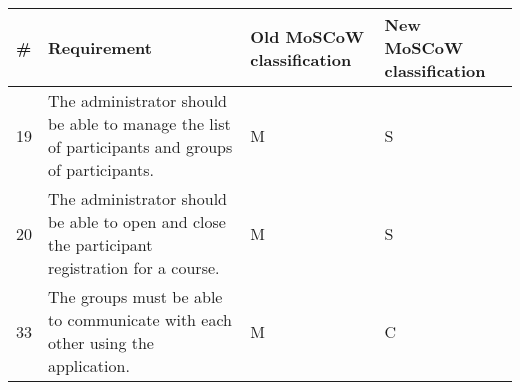 \begin{tabular}{ | p{0.5cm} | p{10cm} | p{2cm} | p{2cm} | }
\hline
\textbf{\#} & \textbf{Requirement} & \textbf{Old MoSCoW classification} & \textbf{New MoSCoW classification} \\ \hline
19 & The administrator should be able to manage the list of participants and groups of participants. & M & S \\ \hline
20 & The administrator should be able to open and close the participant registration for a course. & M & S \\ \hline
33 & The groups must be able to communicate with each other using the application. & M & C \\ \hline
\end{tabular}
